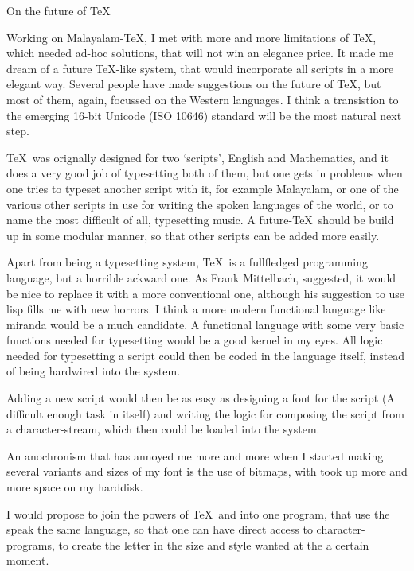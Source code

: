 

\beginsection On the future of \TeX

Working on Malayalam-\TeX, I met with more and more limitations of 
\TeX, which needed ad-hoc solutions, that will not win an elegance 
price. It made me dream of a future \TeX-like system, that would 
incorporate all scripts in a more elegant way. Several people have 
made suggestions on the future of \TeX, but most of them, again, 
focussed on the Western languages. I think a transistion to the 
emerging 16-bit Unicode (ISO 10646) standard will be the most natural 
next step.

\TeX\ was orignally designed for two `scripts', English and 
Mathematics, and it does a very good job of typesetting both of them, 
but one gets in problems when one tries to typeset another script with  
it, for example Malayalam, or one of the various other scripts in use 
for writing the spoken languages of the world, or to name the most 
difficult of all, typesetting music. A future-\TeX\ should be build up 
in some modular manner, so that other scripts can be added more 
easily.

Apart from being a typesetting system, \TeX\ is a fullfledged 
programming language, but a horrible ackward one. As Frank Mittelbach, 
suggested, it would be nice to replace it with a more conventional 
one, although his suggestion to use lisp fills me with new horrors. I 
think a more modern functional language like miranda would be a much  
candidate. A functional language with some very basic functions needed 
for typesetting would be a good kernel in my eyes. All logic needed 
for typesetting a script could then be coded in the language itself, 
instead of being hardwired into the system.

Adding a new script would then be as easy as designing a font for the 
script (A difficult enough task in itself) and writing the logic for 
composing the script from a character-stream, which then could be 
loaded into the system.

An anochronism that has annoyed me more and more when I started making 
several variants and sizes of my font is the use of bitmaps, with took 
up more and more space on my harddisk.

I would propose to join the powers of \TeX\ and \MF into one program, 
that use the speak the same language, so that one can have direct 
access to character-programs, to create the letter in the size and 
style wanted at the a certain moment.


\bye
